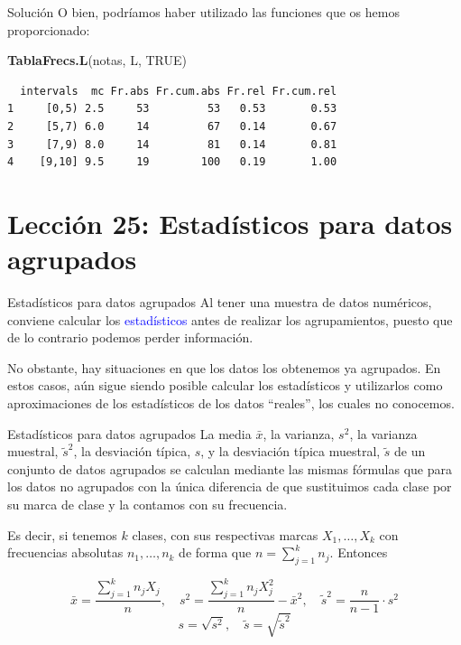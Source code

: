 \documentclass[
  ignorenonframetext,
  aspectratio=169]{beamer}
\newenvironment{Shaded}{\begin{snugshade}}{\end{snugshade}}
\newcommand{\ConstantTok}[1]{\textcolor[rgb]{0.56,0.35,0.01}{#1}}
\newcommand{\FunctionTok}[1]{\textcolor[rgb]{0.13,0.29,0.53}{\textbf{#1}}}
\newcommand{\NormalTok}[1]{#1}
\newcommand\blue[1]{\textcolor{blue}{#1}}
\begin{document}
\begin{frame}[fragile]{Solución}
\label{soluciuxf3n-29}
O bien, podríamos haber utilizado las funciones que os hemos
proporcionado:

\begin{Shaded}
\begin{Highlighting}[]
\FunctionTok{TablaFrecs.L}\NormalTok{(notas, L, }\ConstantTok{TRUE}\NormalTok{)}
\end{Highlighting}
\end{Shaded}

\begin{verbatim}
  intervals  mc Fr.abs Fr.cum.abs Fr.rel Fr.cum.rel
1     [0,5) 2.5     53         53   0.53       0.53
2     [5,7) 6.0     14         67   0.14       0.67
3     [7,9) 8.0     14         81   0.14       0.81
4    [9,10] 9.5     19        100   0.19       1.00
\end{verbatim}
\end{frame}

\section{Lección 25: Estadísticos para datos
agrupados}\label{lecciuxf3n-25-estaduxedsticos-para-datos-agrupados}

\begin{frame}{Estadísticos para datos agrupados}
\label{estaduxedsticos-para-datos-agrupados}
Al tener una muestra de datos numéricos, conviene calcular los
\blue{ estadísticos } antes de realizar los agrupamientos, puesto que de
lo contrario podemos perder información.

No obstante, hay situaciones en que los datos los obtenemos ya
agrupados. En estos casos, aún sigue siendo posible calcular los
estadísticos y utilizarlos como aproximaciones de los estadísticos de
los datos ``reales'', los cuales no conocemos.
\end{frame}

\begin{frame}{Estadísticos para datos agrupados}
\label{estaduxedsticos-para-datos-agrupados-1}
La media \(\bar{x}\), la varianza, \(s^2\), la varianza muestral,
\(\tilde{s}^2\), la desviación típica, \(s\), y la desviación típica
muestral, \(\tilde{s}\) de un conjunto de datos agrupados se calculan
mediante las mismas fórmulas que para los datos no agrupados con la
única diferencia de que sustituimos cada clase por su marca de clase y
la contamos con su frecuencia.

Es decir, si tenemos \(k\) clases, con sus respectivas marcas
\(X_1,\dots,X_k\) con frecuencias absolutas \(n_1,\dots,n_k\) de forma
que \(n=\sum_{j=1}^kn_j\). Entonces

\[\bar{x}=\frac{\sum_{j=1}^kn_jX_j}{n},\quad s^2=\frac{\sum_{j=1}^kn_jX_j^2}{n}-\bar{x}^2,\quad \tilde{s}^2=\frac{n}{n-1}\cdot s^2\]
\[s=\sqrt{s^2},\quad \tilde{s}=\sqrt{\tilde{s}^2}\]
\end{frame}
\end{document}
